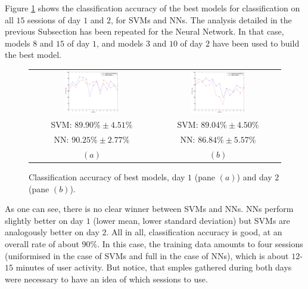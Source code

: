Figure \ref{fig:best_class} shows the classification accuracy of the best
models for classification on all $15$ sessions of day $1$ and $2$, for
SVMs and NNs. The analysis detailed in the previous Subsection has
been repeated for the Neural Network. In that case, models $8$ and
$15$ of day $1$, and models $3$ and $10$ of day $2$ have been used to
build the best model.

\begin{figure}[!ht] \centering
  \begin{tabular}{cc}
    \includegraphics[width=0.45\textwidth]{figs/fig_class_resCrossBestOnDay1} & \includegraphics[width=0.45\textwidth]{figs/fig_class_resCrossBestOnDay2} \\
    SVM: $89.90\% \pm 4.51\%$ & SVM: $89.04\% \pm 4.50\%$ \\
    NN: $90.25\% \pm 2.77\%$ & NN: $86.84\% \pm 5.57\%$ \\
    $(a)$ & $(b)$ \\
  \end{tabular}
  \caption{Classification accuracy of best models, day $1$ (pane
  $(a)$) and day $2$ (pane $(b)$).}
  \label{fig:best_class}
\end{figure}

As one can see, there is no clear winner between SVMs and NNs. NNs
perform slightly better on day $1$ (lower mean, lower standard
deviation) but SVMs are analogously better on day $2$. All in all,
classification accuracy is good, at an overall rate of about
$90\%$. In this case, the training data amounts to four sessions
(uniformised in the case of SVMs and full in the case of NNs), which
is about $12$-$15$ minutes of user activity. But notice, that smples
gathered during both days were necessary to have an idea of which
sessions to use.
